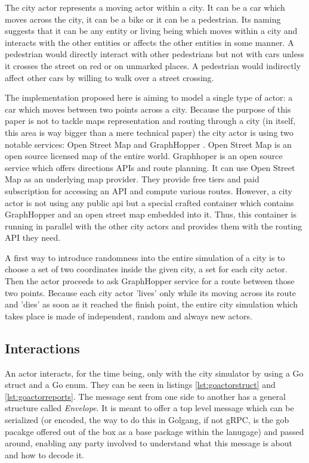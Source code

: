 \documentclass[conference]{IEEEtran}
\begin{document}
The city actor represents a moving actor within a city. It can be a car which moves across the city, it can be a bike or it can be a pedestrian. Its naming suggests that it can be any entity or living being which moves within a city and interacts with the other entities or affects the other entities in some manner. A pedestrian would directly interact with other pedestrians but not with cars unless it crosses the street on red or on unmarked places. A pedestrian would indirectly affect other cars by willing to walk over a street crossing.

The implementation proposed here is aiming to model a single type of actor: a car which moves between two points across a city. Because the purpose of this paper is not to tackle maps representation and routing through a city (in itself, this area is way bigger than a mere technical paper) the city actor is using two notable services: Open Street Map \cite{openstreetmap} and GraphHopper \cite{graphhopper}. Open Street Map is an open source licensed map of the entire world. Graphhoper is an open source service which offers directions APIs and route planning. It can use Open Street Map as an underlying map provider. They provide free tiers and paid subscription for accessing an API and compute various routes. However, a city actor is not using any public api but a special crafted container which contains GraphHopper and an open street map embedded into it. Thus, this container is running in parallel with the other city actors and provides them with the routing API they need.

A first way to introduce randomness into the entire simulation of a city is to choose a set of two coordinates inside the given city, a set for each city actor. Then the actor proceeds to ask GraphHopper service for a route between those two points. Because each city actor 'lives' only while its moving across its route and 'dies' as soon as it reached the finish point, the entire city simulation which takes place is made of independent, random and always new actors.

\subsection{Interactions}

An actor interacts, for the time being, only with the city simulator by using a Go struct and a Go enum. They can be seen in listings \ref{lst:goactorstruct} and \ref{lst:goactorreports}. The message sent from one side to another has a general structure called \textit{Envelope}. It is meant to offer a top level message which can be serialized (or encoded, the way to do this in Golgang, if not gRPC, is the gob pacakge offered out of the box as a base package within the lanugage) and passed around, enabling any party involved to understand what this message is about and how to decode it.
\end{document}
